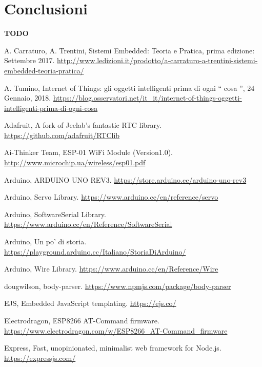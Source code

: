 \documentclass[12pt]{report}
\begin{document}
%
\section{Conclusioni}
%

\textbf{TODO}


%
\begin{thebibliography}{00}
%
%

%
A. Carraturo, A. Trentini, Sistemi Embedded: Teoria e Pratica, prima edizione: Settembre 2017.
\url{http://www.ledizioni.it/prodotto/a-carraturo-a-trentini-sistemi-embedded-teoria-pratica/}
%

%
A. Tumino, Internet of Things: gli oggetti intelligenti prima di ogni \textquotedblleft{} cosa \textquotedblright{}, 24 Gennaio, 2018.
\url{https://blog.osservatori.net/it_it/internet-of-things-oggetti-intelligenti-prima-di-ogni-cosa}
%

%
Adafruit, A fork of Jeelab's fantastic RTC library.
\url{https://github.com/adafruit/RTClib}
%

%
Ai-Thinker Team, ESP-01 WiFi Module (Version1.0).
\url{http://www.microchip.ua/wireless/esp01.pdf}
%

%
Arduino, ARDUINO UNO REV3.
\url{https://store.arduino.cc/arduino-uno-rev3}
%

%
Arduino, Servo Library. \url{https://www.arduino.cc/en/reference/servo}
%

%
Arduino, SoftwareSerial Library.
\url{https://www.arduino.cc/en/Reference/SoftwareSerial}
%

%
Arduino, Un po' di storia.
\url{https://playground.arduino.cc/Italiano/StoriaDiArduino/}
%

%
Arduino, Wire Library.
\url{https://www.arduino.cc/en/Reference/Wire}
%

%
dougwilson, body-parser.
\url{https://www.npmjs.com/package/body-parser}
%

%
EJS, Embedded JavaScript templating.
\url{https://ejs.co/}
%

%
Electrodragon, ESP8266 AT-Command firmware.
\url{https://www.electrodragon.com/w/ESP8266\_AT-Command\_firmware}
%

%
Express, Fast, unopinionated, minimalist web framework for Node.js.
\url{https://expressjs.com/}
%


\end{thebibliography}
\end{document}
